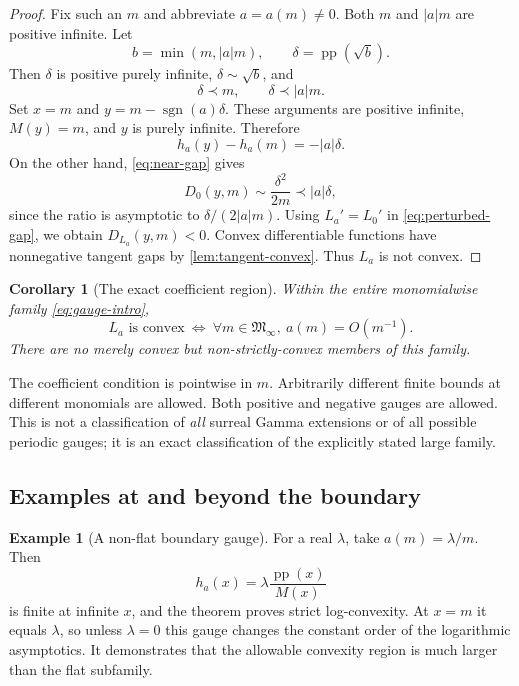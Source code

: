 \documentclass[11pt,letterpaper]{article}
\numberwithin{equation}{section}
\theoremstyle{plain}
\newtheorem{corollary}[corollary]{Corollary}
\theoremstyle{definition}
\newtheorem{example}[example]{Example}
\theoremstyle{remark}
\newcommand{\Minf}{\mathfrak M_{\infty}}
\newcommand{\pp}{\operatorname{pp}}
\newcommand{\sgn}{\operatorname{sgn}}
\newcommand{\abs}[1]{\lvert#1\rvert}
\begin{document}
\begin{proof}
Fix such an $m$ and abbreviate $a=a(m)\ne0$. Both $m$ and $\abs a m$
are positive infinite. Let
\[
 b=\min(m,\abs a m),\qquad \delta=\pp(\sqrt b).
\]
Then $\delta$ is positive purely infinite, $\delta\sim\sqrt b$, and
\begin{equation}\label{eq:delta-choice}
 \delta\prec m,\qquad \delta\prec\abs a m.
\end{equation}
Set $x=m$ and $y=m-\sgn(a)\delta$. These arguments are positive infinite,
$M(y)=m$, and $y$ is purely infinite. Therefore
\[
 h_a(y)-h_a(m)=-\abs a\delta.
\]
On the other hand, \eqref{eq:near-gap} gives
\[
 D_0(y,m)\sim\frac{\delta^2}{2m}\prec\abs a\delta,
\]
since the ratio is asymptotic to $\delta/(2\abs a m)$.
Using $L_a'=L_0'$ in \eqref{eq:perturbed-gap}, we obtain
$D_{L_a}(y,m)<0$. Convex differentiable functions have nonnegative tangent
gaps by \cref{lem:tangent-convex}. Thus $L_a$ is not convex.
\end{proof}

\begin{corollary}[The exact coefficient region]\label{cor:sharp-region}
Within the entire monomialwise family \eqref{eq:gauge-intro},
\[
 \boxed{\quad L_a\text{ is convex}
 \ \Longleftrightarrow\
 \forall m\in\Minf,\ a(m)=O(m^{-1}).\quad}
\]
There are no merely convex but non-strictly-convex members of this family.
\end{corollary}

The coefficient condition is pointwise in $m$. Arbitrarily different finite
bounds at different monomials are allowed. Both positive and negative gauges
are allowed. This is not a classification of \emph{all} surreal Gamma
extensions or of all possible periodic gauges; it is an exact classification
of the explicitly stated large family.

\subsection{Examples at and beyond the boundary}
\begin{example}[A non-flat boundary gauge]\label{ex:boundary}
For a real $\lambda$, take $a(m)=\lambda/m$. Then
\[
 h_a(x)=\lambda\frac{\pp(x)}{M(x)}
\]
is finite at infinite $x$, and the theorem proves strict log-convexity.
At $x=m$ it equals $\lambda$, so unless $\lambda=0$ this gauge changes the
constant order of the logarithmic asymptotics. It demonstrates that the
allowable convexity region is much larger than the flat subfamily.
\end{example}
\end{document}

